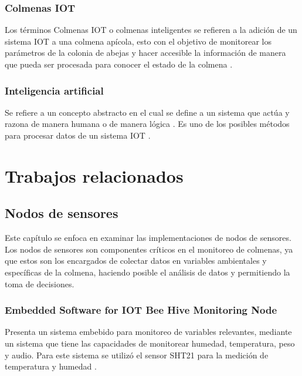\documentclass[journal]{IEEEtran} %
\begin{document}
\subsubsection{Colmenas IOT}
Los términos Colmenas IOT o colmenas inteligentes se refieren a la adición de un sistema IOT a una colmena apícola, esto con el objetivo de monitorear los parámetros de la colonia de abejas y hacer accesible la información de manera que pueda ser procesada para conocer el estado de la colmena \cite{TheIAAC}.
\subsubsection{Inteligencia artificial}
Se refiere a un concepto abstracto en el cual se define a un sistema que actúa y razona de manera humana o de manera lógica \cite{Russell2022ArtificialEdition}. Es uno de los posibles métodos para procesar datos de un sistema IOT \cite{TheIAAC}.

\section{Trabajos relacionados}
\subsection{Nodos de sensores}
Este capítulo se enfoca en examinar las implementaciones de nodos de sensores. Los nodos de sensores son componentes críticos en el monitoreo de colmenas, ya que estos son los encargados de colectar datos en variables ambientales y específicas de la colmena, haciendo posible el análisis de datos y permitiendo la toma de decisiones.
\subsubsection{Embedded Software for IOT Bee Hive Monitoring Node}
Presenta un sistema embebido para monitoreo de variables relevantes, mediante un sistema que tiene las capacidades de monitorear humedad, temperatura, peso y audio. Para este sistema se utilizó el sensor SHT21 \cite{SHT21-2Sensor} para la medición de temperatura y humedad \cite{Vidrascu2017EmbeddedNode}.
\end{document}
